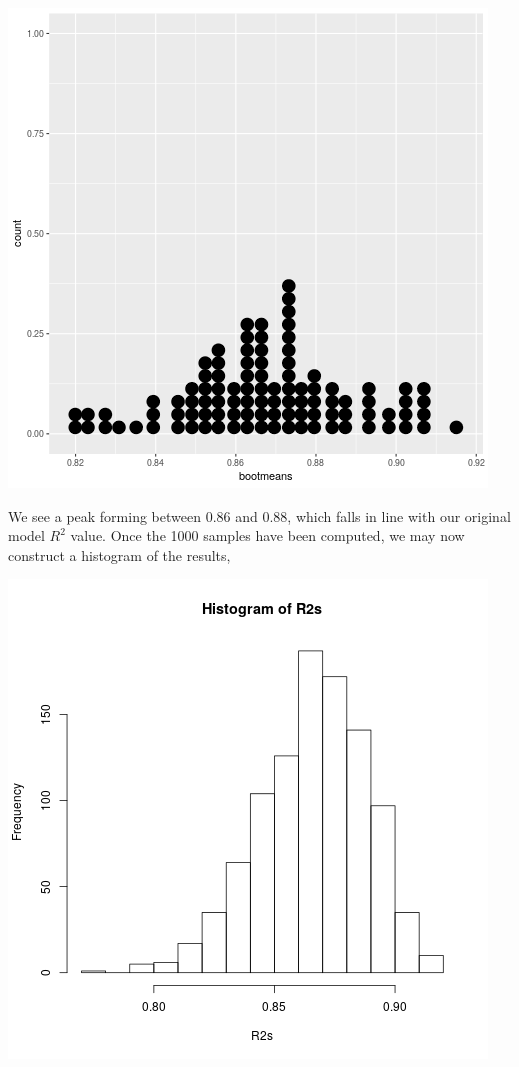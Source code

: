 \documentclass[letterpaper,10pt]{article}
\begin{document}
\begin{enumerate}
\begin{center}
\includegraphics[scale=.65]{R2dot.png}
\end{center}
We see a peak forming between $0.86$ and $0.88$, which falls in line with our original model $R^2$ value. Once the 1000 samples have been computed, we may now construct a histogram of the results,
\begin{center}
\includegraphics[scale=.65]{R2hist.png}

\end{center}
\end{enumerate}
\end{document}
